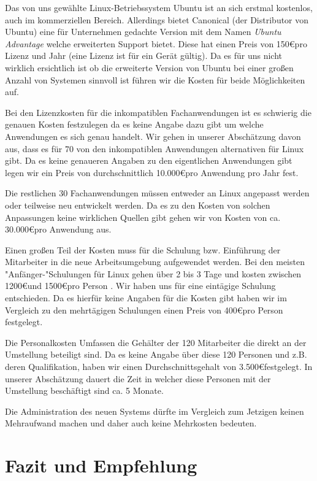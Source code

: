 \documentclass[12pt,utf8]{scrartcl}
\begin{document}
Das von uns gewählte Linux-Betriebssystem Ubuntu ist an sich erstmal kostenlos, auch im kommerziellen Bereich. Allerdings bietet Canonical (der Distributor von Ubuntu) eine für Unternehmen gedachte Version mit dem Namen \emph{Ubuntu Advantage} welche erweiterten Support bietet. Diese hat einen Preis von 150\euro \space pro Lizenz und Jahr (eine Lizenz ist für ein Gerät gültig). Da es für uns nicht wirklich ersichtlich ist ob die erweiterte Version von Ubuntu bei einer großen Anzahl von Systemen sinnvoll ist führen wir die Kosten für beide Möglichkeiten auf.

Bei den Lizenzkosten für die inkompatiblen Fachanwendungen ist es schwierig die genauen Kosten festzulegen da es keine Angabe dazu gibt um welche Anwendungen es sich genau handelt. Wir gehen in unserer Abschätzung davon aus, dass es für 70 von den inkompatiblen Anwendungen alternativen für Linux gibt. Da es keine genaueren Angaben zu den eigentlichen Anwendungen gibt legen wir ein Preis von durchschnittlich 10.000\euro \space pro Anwendung pro Jahr fest. 

Die restlichen 30 Fachanwendungen müssen entweder an Linux angepasst werden oder teilweise neu entwickelt werden. Da es zu den Kosten von solchen Anpassungen keine wirklichen Quellen gibt gehen wir von Kosten von ca. 30.000\euro pro Anwendung aus.

Einen großen Teil der Kosten muss für die Schulung bzw. Einführung der Mitarbeiter in die neue Arbeitsumgebung aufgewendet werden. Bei den meisten "Anfänger-"Schulungen für Linux gehen über 2 bis 3 Tage und kosten zwischen 1200\euro \space und 1500\euro \space pro Person . Wir haben uns für eine eintägige Schulung entschieden. Da es hierfür keine Angaben für die Kosten gibt haben wir im Vergleich zu den mehrtägigen Schulungen einen Preis von 400\euro \space pro Person festgelegt. 

Die Personalkosten Umfassen die Gehälter der 120 Mitarbeiter die direkt an der Umstellung beteiligt sind. Da es keine Angabe über diese 120 Personen und z.B. deren Qualifikation, haben wir einen Durchschnittsgehalt von 3.500\euro \space festgelegt. In unserer Abschätzung dauert die Zeit in welcher diese Personen mit der Umstellung beschäftigt sind ca. 5 Monate. 

Die Administration des neuen Systems dürfte im Vergleich zum Jetzigen keinen Mehraufwand machen und daher auch keine Mehrkosten bedeuten.




\section*{Fazit und Empfehlung}

\newpage
{}

\end{document}
